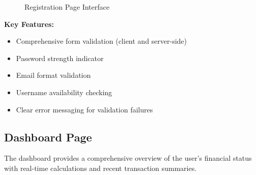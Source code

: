 \begin{figure}[h]
\centering
{}
\caption{Registration Page Interface}
\label{fig:register}
\end{figure}

\textbf{Key Features:}
\begin{itemize}
    \item Comprehensive form validation (client and server-side)
    \item Password strength indicator
    \item Email format validation
    \item Username availability checking
    \item Clear error messaging for validation failures
\end{itemize}

\subsection{Dashboard Page}

The dashboard provides a comprehensive overview of the user's financial status with real-time calculations and recent transaction summaries.

